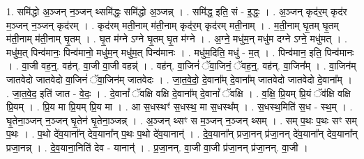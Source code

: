 \documentclass[17pt]{extarticle}
\begin{document}
1. समि॑द्धो अ॒ञ्जन् न॒ञ्जन् थ्समि॑द्धः॒ समि॑द्धो अ॒ञ्जन्न् । . समि॑द्ध॒ इति॒ सं - इ॒द्धः॒ । . अ॒ञ्जन् कृद॑र॒म् कृद॑र म॒ञ्जन् न॒ञ्जन् कृद॑रम् । . कृद॑रम् मती॒नाम् म॑ती॒नाम् कृद॑र॒म् कृद॑रम् मती॒नाम् । . म॒ती॒नाम् घृ॒तम् घृ॒तम् म॑ती॒नाम् म॑ती॒नाम् घृ॒तम् । . घृ॒त म॑ग्ने ऽग्ने घृ॒तम् घृ॒त म॑ग्ने । . अ॒ग्ने॒ मधु॑म॒न् मधु॑म दग्ने ऽग्ने॒ मधु॑मत् । . मधु॑म॒त् पिन्व॑मानः॒ पिन्व॑मानो॒ मधु॑म॒न् मधु॑म॒त् पिन्व॑मानः । . मधु॑म॒दिति॒ मधु॑ - म॒त् । . पिन्व॑मान॒ इति॒ पिन्व॑मानः । . वा॒जी वह॒न्॒. वह॑न्. वा॒जी वा॒जी वहन्न्॑ । . वह॑न्. वा॒जिनं॑ ॅवा॒जिनं॒ ॅवह॒न्॒. वह॑न्. वा॒जिन᳚म् । . वा॒जिन॑म् जातवेदो जातवेदो वा॒जिनं॑ ॅवा॒जिन॑म् जातवेदः । . जा॒त॒वे॒दो॒ दे॒वाना᳚म् दे॒वाना᳚म् जातवेदो जातवेदो दे॒वाना᳚म् । . जा॒त॒वे॒द॒ इति॑ जात - वे॒दः॒ । . दे॒वानां᳚ ॅवक्षि वक्षि दे॒वाना᳚म् दे॒वानां᳚ ॅवक्षि । . व॒क्षि॒ प्रि॒यम् प्रि॒यं ॅव॑क्षि वक्षि प्रि॒यम् । . प्रि॒य मा प्रि॒यम् प्रि॒य मा । . आ स॒धस्थꣳ॑ स॒धस्थ॒ मा स॒धस्थ᳚म् । . स॒धस्थ॒मिति॑ स॒ध - स्थ॒म् । . घृ॒तेना॒ञ्जन् न॒ञ्जन् घृ॒तेन॑ घृ॒तेना॒ञ्जन्न् । . अ॒ञ्जन् थ्सꣳ स म॒ञ्जन् न॒ञ्जन् थ्सम् । . सम् प॒थः प॒थः सꣳ सम् प॒थः । . प॒थो दे॑व॒याना᳚न् देव॒याना᳚न् प॒थः प॒थो दे॑व॒यानान्॑ । . दे॒व॒याना᳚न् प्रजा॒नन् प्र॑जा॒नन् दे॑व॒याना᳚न् देव॒याना᳚न् प्रजा॒नन्न् । . दे॒व॒याना॒निति॑ देव - यानान्॑ । . प्र॒जा॒नन्. वा॒जी वा॒जी प्र॑जा॒नन् प्र॑जा॒नन्. वा॒जी । \newline
\end{document}
